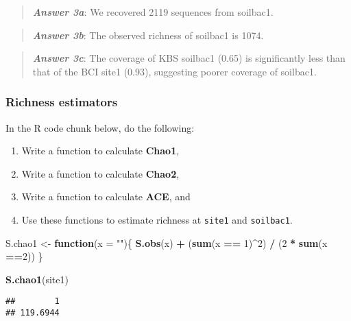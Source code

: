 \documentclass[
]{article}
\newenvironment{Shaded}{\begin{snugshade}}{\end{snugshade}}
\newcommand{\AttributeTok}[1]{\textcolor[rgb]{0.13,0.29,0.53}{#1}}
\newcommand{\ControlFlowTok}[1]{\textcolor[rgb]{0.13,0.29,0.53}{\textbf{#1}}}
\newcommand{\DecValTok}[1]{\textcolor[rgb]{0.00,0.00,0.81}{#1}}
\newcommand{\FunctionTok}[1]{\textcolor[rgb]{0.13,0.29,0.53}{\textbf{#1}}}
\newcommand{\NormalTok}[1]{#1}
\newcommand{\OtherTok}[1]{\textcolor[rgb]{0.56,0.35,0.01}{#1}}
\newcommand{\SpecialCharTok}[1]{\textcolor[rgb]{0.81,0.36,0.00}{\textbf{#1}}}
\newcommand{\StringTok}[1]{\textcolor[rgb]{0.31,0.60,0.02}{#1}}
\begin{document}
\begin{quote}
\textbf{\emph{Answer 3a}}: We recovered 2119 sequences from soilbac1.
\end{quote}

\begin{quote}
\textbf{\emph{Answer 3b}}: The observed richness of soilbac1 is 1074.
\end{quote}

\begin{quote}
\textbf{\emph{Answer 3c}}: The coverage of KBS soilbac1 (0.65) is
significantly less than that of the BCI site1 (0.93), suggesting poorer
coverage of soilbac1.
\end{quote}

\subsubsection{Richness estimators}\label{richness-estimators}

In the R code chunk below, do the following:

\begin{enumerate}
\def\labelenumi{\arabic{enumi}.}
\item
  Write a function to calculate \textbf{Chao1},
\item
  Write a function to calculate \textbf{Chao2},
\item
  Write a function to calculate \textbf{ACE}, and
\item
  Use these functions to estimate richness at \texttt{site1} and
  \texttt{soilbac1}.
\end{enumerate}

\begin{Shaded}
\begin{Highlighting}[]
\NormalTok{S.chao1 }\OtherTok{\textless{}{-}} \ControlFlowTok{function}\NormalTok{(}\AttributeTok{x =} \StringTok{""}\NormalTok{)\{}
  \FunctionTok{S.obs}\NormalTok{(x) }\SpecialCharTok{+}\NormalTok{ (}\FunctionTok{sum}\NormalTok{(x }\SpecialCharTok{==} \DecValTok{1}\NormalTok{)}\SpecialCharTok{\^{}}\DecValTok{2}\NormalTok{) }\SpecialCharTok{/}\NormalTok{ (}\DecValTok{2} \SpecialCharTok{*} \FunctionTok{sum}\NormalTok{(x }\SpecialCharTok{==}\DecValTok{2}\NormalTok{))}
\NormalTok{\}}

\FunctionTok{S.chao1}\NormalTok{(site1)}
\end{Highlighting}
\end{Shaded}

\begin{verbatim}
##        1 
## 119.6944
\end{verbatim}
\end{document}
